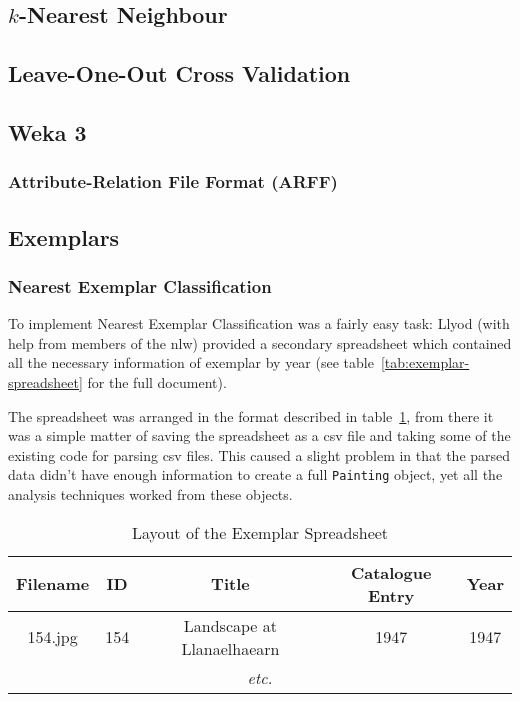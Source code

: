 \subsection{$k$-Nearest Neighbour}

\subsection{Leave-One-Out Cross Validation}

\subsection{Weka 3}
\subsubsection{Attribute-Relation File Format (ARFF)}

\subsection{Exemplars}
\subsubsection{Nearest Exemplar Classification}
To implement Nearest Exemplar Classification was a fairly easy task: Llyod (with help from members
of the \gls{nlw}) provided a secondary spreadsheet which contained all the necessary information 
of exemplar by year (see table~\ref{tab:exemplar-spreadsheet} for the full document).

The spreadsheet was arranged in the format described in table~\ref{tab:exemplar-layout}, from
there it was a simple matter of saving the spreadsheet as a \gls{csv} file and taking some of the
existing code for parsing \gls{csv} files. This caused a slight problem in that the parsed data
didn't have enough information to create a full \texttt{Painting} object, yet all the analysis
techniques worked from these objects.

\begin{table}[h]
\centering
\begin{tabular}{|c|c|c|c|c|} \hline
Filename & ID  & Title                      & Catalogue Entry & Year \\\hline
154.jpg  & 154 & Landscape at Llanaelhaearn & 1947            & 1947 \\\hline
\multicolumn{5}{|c|}{\textit{etc.}}\\\hline
\end{tabular}
\caption{Layout of the Exemplar Spreadsheet}\label{tab:exemplar-layout}
\end{table}

